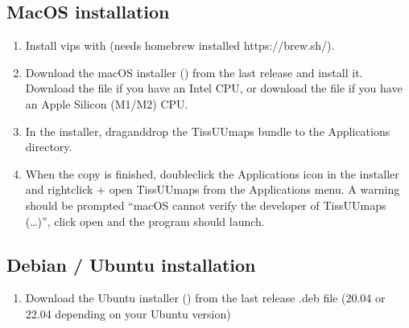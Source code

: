 \documentclass[letterpaper,10pt,english,openany,oneside]{sphinxmanual}
\begin{document}
\subsection{MacOS installation}
\label{\detokenize{docs/intro/installation:macos-installation}}\begin{enumerate}
%
\item {} 
\sphinxAtStartPar
Install vips with  (needs homebrew installed https://brew.sh/).

\item {} 
\sphinxAtStartPar
Download the macOS installer () from the last release and install it. Download the  file if you have an Intel CPU, or download the  file if you have an Apple Silicon (M1/M2) CPU.

\item {} 
\sphinxAtStartPar
In the installer, drag\sphinxhyphen{}and\sphinxhyphen{}drop the TissUUmaps bundle to the Applications directory.

\item {} 
\sphinxAtStartPar
When the copy is finished, double\sphinxhyphen{}click the Applications icon in the installer and right\sphinxhyphen{}click + open TissUUmaps from the Applications menu.
\sphinxhyphen{} A warning should be prompted “macOS cannot verify the developer of TissUUmaps (…)”, click open and the program should launch.

\end{enumerate}


\subsection{Debian / Ubuntu installation}
\label{\detokenize{docs/intro/installation:debian-ubuntu-installation}}\begin{enumerate}
%
\item {} 
\sphinxAtStartPar
Download the Ubuntu installer () from the last release .deb file (20.04 or 22.04 depending on your Ubuntu version)

\end{enumerate}
\end{document}
